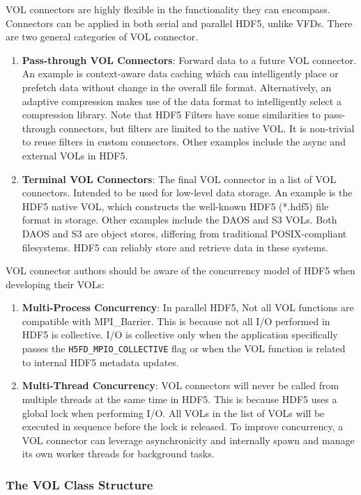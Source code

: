 VOL connectors are highly flexible in the functionality they can encompass. Connectors can be applied in both serial and parallel HDF5, unlike VFDs. There are two general categories of VOL connector.
\begin{enumerate}
    \item \textbf{Pass-through VOL Connectors}: Forward data to a future VOL connector. An example is context-aware data caching which can intelligently place or prefetch data without change in the overall file format. Alternatively, an adaptive compression makes use of the data format to intelligently select a compression library. Note that HDF5 Filters have some similarities to pass-through connectors, but filters are limited to the native VOL. It is non-trivial to reuse filters in custom connectors. Other examples include the async and external VOLs in HDF5.
    \item \textbf{Terminal VOL Connectors}: The final VOL connector in a list of VOL connectors. Intended to be used for low-level data storage. An example is the HDF5 native VOL, which constructs the well-known HDF5 (*.hdf5) file format in storage. Other examples include the DAOS and S3 VOLs. Both DAOS and S3 are object stores, differing from traditional POSIX-compliant filesystems. HDF5 can reliably store and retrieve data in these systems.
\end{enumerate}

VOL connector authors should be aware of the concurrency model of HDF5 when developing their VOLs:
\begin{enumerate}
    \item \textbf{Multi-Process Concurrency}: In parallel HDF5, Not all VOL functions are compatible with MPI\_Barrier. This is because not all I/O performed in HDF5 is collective. I/O is collective only when the application specifically passes the \texttt{H5FD\_MPIO\_COLLECTIVE} flag or when the VOL function is related to internal HDF5 metadata updates.
    \item \textbf{Multi-Thread Concurrency}: VOL connectors will never be called from multiple threads at the same time in HDF5. This is because HDF5 uses a global lock when performing I/O. All VOLs in the list of VOLs will be executed in sequence before the lock is released. To improve concurrency, a VOL connector can leverage asynchronicity and internally spawn and manage its own worker threads for background tasks.
\end{enumerate}

\subsubsection{The VOL Class Structure}

